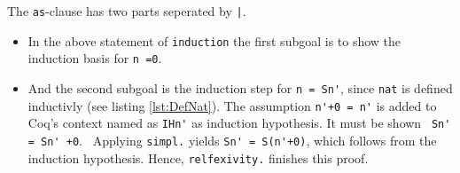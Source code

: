 The \lstinline!as!-clause has two parts seperated by \lstinline!|!.
\begin{itemize}
	\item In the above statement of \lstinline!induction! the first subgoal is to show the induction basis for \lstinline!n =0!.
	\item And the second subgoal is the induction step for \lstinline!n = Sn'!, since \lstinline!nat! is defined inductivly (see listing  \ref{lst:DefNat}).
	      The assumption \lstinline!n'+0 = n'! is added to Coq's context named as \lstinline!IHn'! as induction hypothesis.
		  It must be shown \lstinline! Sn' = Sn' +0!. \
          Applying \lstinline!simpl.! yields \lstinline!Sn' = S(n'+0)!, which follows from the induction hypothesis. 
          Hence, \lstinline!relfexivity.! finishes this proof.
\end{itemize} 




